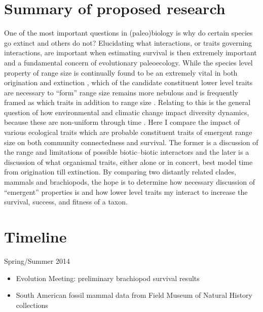 \documentclass[12pt,letterpaper]{article}
\begin{document}
\section{Summary of proposed research}
One of the most important questions in (paleo)biology is why do certain species go extinct and others do not? %
Elucidating what interactions, or traits governing interactions, are important when estimating survival is then extremely important and a fundamental concern of evolutionary paleoecology. While the species level property of range size is continually found to be an extremely vital in both origination and extinction \citep{Roy2009c,Foote2013,Jablonski2003,Jablonski1987,Harnik2013}, which of the candidate constituent lower level traits are necessary to ``form'' range size remains more nebulous and is frequently framed as which traits in addition to range size \citep{Foote2013,Harnik2011,Nurnberg2013a}. Relating to this is the general question of how environmental and climatic change impact diversity dynamics, because these are non-uniform through time \citep{Barnosky2001a,Alroy2000g,Figueirido2012,Olszewski2004}.
Here I compare the impact of various ecological traits which are probable constituent traits of emergent range size on both community connectedness and survival. The former is a discussion of the range and limitations of possible biotic--biotic interactors and the later is a discussion of what organismal traits, either alone or in concert, best model time from origination till extinction. By comparing two distantly related clades, mammals and brachiopods, the hope is to determine how necessary discussion of ``emergent'' properties is and how lower level traits my interact to increase the survival, success, and fitness of a taxon.


\clearpage
\section{Timeline}

Spring/Summer 2014
\begin{itemize}
  \item Evolution Meeting: preliminary brachiopod survival results
  \item South American fossil mammal data from Field Museum of Natural History collections
\end{itemize}
\end{document}
